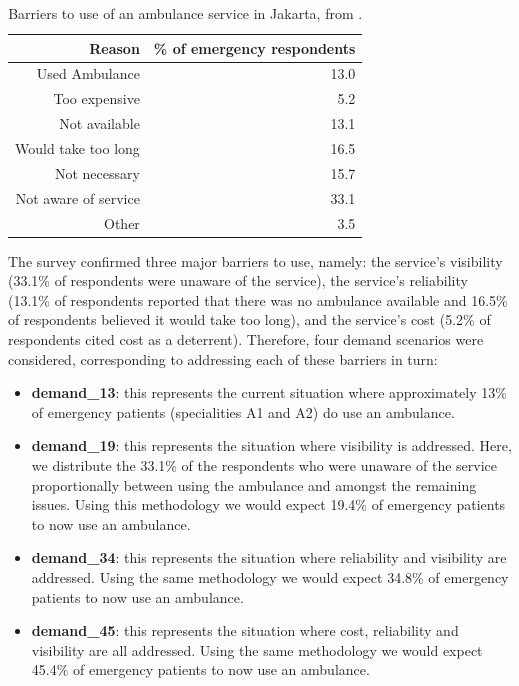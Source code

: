 \documentclass[preprint,12pt]{elsarticle}
\begin{document}
\begin{table} \centering \begin{tabular}{rr} \toprule Reason & \% of emergency
    respondents \\

\midrule Used Ambulance & 13.0\\ Too expensive & 5.2  \\ Not available  & 13.1
    \\ Would take too long & 16.5 \\ Not necessary & 15.7  \\ Not aware of
    service & 33.1\\ Other &3.5 \\

 \bottomrule \end{tabular} \caption{Barriers to use of an ambulance service in
 Jakarta, from \cite{BriceSyaribahNoor2022Esui}.} \label{table:survey_results}
 \end{table}

The survey confirmed three major barriers to use, namely: the service's
visibility (33.1\% of respondents were unaware of the service), the service's
reliability (13.1\% of respondents reported that there was no ambulance
available and 16.5\% of respondents believed it would take too long), and the
service's cost (5.2\% of respondents cited cost as a deterrent). Therefore, four
demand scenarios were considered, corresponding to addressing each of these
barriers in turn:

\begin{itemize} \item \textbf{demand\_13}: this represents the current situation
            where approximately 13\% of emergency patients (specialities A1 and
        A2) do use an ambulance.  \item \textbf{demand\_19}: this represents the
            situation where visibility is addressed. Here, we distribute the
            33.1\% of the respondents who were unaware of the service
            proportionally between using the ambulance and amongst the remaining
            issues. Using this methodology we would expect 19.4\% of emergency
            patients to now use an ambulance.  \item \textbf{demand\_34}: this
                represents the situation where reliability and visibility are
                addressed. Using the same methodology we would expect 34.8\% of
                emergency patients to now use an ambulance.  \item
                    \textbf{demand\_45}: this represents the situation where
                    cost, reliability and visibility are all addressed. Using
                    the same methodology we would expect 45.4\% of emergency
                    patients to now use an ambulance.  \end{itemize}
\end{document}
